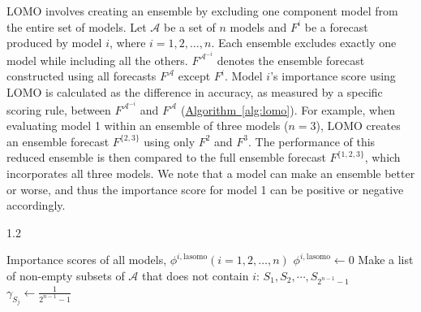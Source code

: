 \documentclass[
  article,
  shortnames,
  notitle]{jss}
\begin{document}
LOMO involves creating an ensemble by excluding one component model from
the entire set of models. Let \({\mathcal A}\) be a set of \(n\) models
and \(F^i\) be a forecast produced by model \(i\), where
\(i = 1,2, \dots, n.\) Each ensemble excludes exactly one model while
including all the others. \(F^{{\mathcal A}^{-i}}\) denotes the ensemble
forecast constructed using all forecasts \(F^{\mathcal A}\) except
\(F^i\). Model \(i\)'s importance score using LOMO is calculated as the
difference in accuracy, as measured by a specific scoring rule, between
\(F^{{\mathcal A}^{-i}}\) and \(F^{\mathcal A}\)
(\hyperref[alg:lomo]{Algorithm~\ref{alg:lomo}}). For example, when
evaluating model 1 within an ensemble of three models (\(n=3\)), LOMO
creates an ensemble forecast \(F^{\{2,3\}}\) using only \(F^2\) and
\(F^3\). The performance of this reduced ensemble is then compared to
the full ensemble forecast \(F^{\{1,2,3\}}\), which incorporates all
three models. We note that a model can make an ensemble better or worse,
and thus the importance score for model 1 can be positive or negative
accordingly.

\begin{algorithm}[t!]
\caption{Importance score calculation for one prediction task using leave all subsets of models out (LASOMO) algorithm} 
\label{alg:lasomo}
 \begin{spacing}{1.2}
  \begin{algorithmic}[1]
   \ENSURE Importance scores of all models, $\phi^{i,\text{lasomo}} (i=1,2,\dots, n)$
     \STATE $\phi^{i,\text{lasomo}} \gets 0$
     \STATE Make a list of non-empty subsets of $\mathcal A$ that does not contain $i$: $S_1, S_2, \cdots, S_{2^{n-1}-1}$
           \STATE $\gamma_{S_j} \gets \displaystyle\frac{1}{2^{n-1}-1}$
         \ENDIF
     \ENDFOR
   \ENDFOR
  \end{algorithmic}
 \end{spacing}
\end{algorithm}
\end{document}
